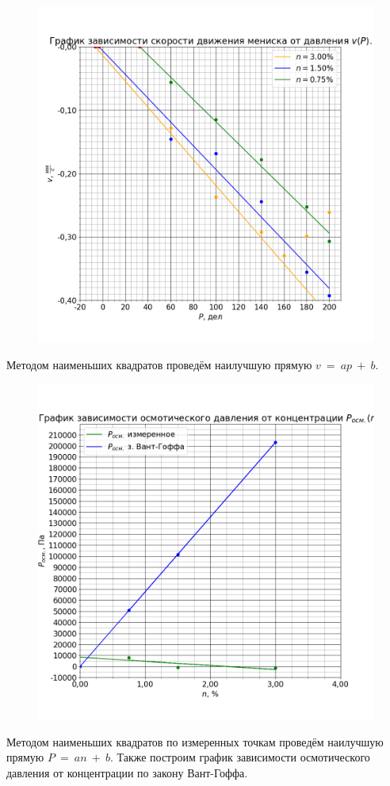 \begin{figure}[H]
	\centering
	\includegraphics[width=1 \textwidth]{../plots/graph_v_p.png}
\end{figure}

Методом наименьших квадратов проведём наилучшую прямую $v~=~ap~+~b$.



\begin{figure}[H]
	\centering
	\includegraphics[width=1 \textwidth]{../plots/graph_p_osm_n.png}
\end{figure}

Методом наименьших квадратов по измеренных точкам проведём наилучшую прямую $P~=~an~+~b$. Также построим график зависимости осмотического давления от концентрации по закону Вант-Гоффа.


